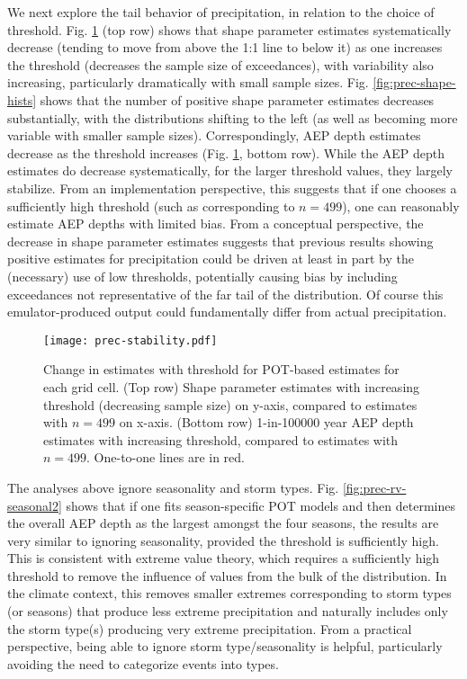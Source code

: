 \documentclass{ametsocV6.1}
\begin{document}
We next explore the tail behavior of precipitation, in relation to the choice of threshold. Fig. \ref{fig:prec-stability} (top row) shows that shape parameter estimates systematically decrease (tending to move from above the 1:1 line to below it) as one increases the threshold (decreases the sample size of exceedances), with variability also increasing, particularly dramatically with small sample sizes. Fig. \ref{fig:prec-shape-hists} shows that the number of positive shape parameter estimates decreases substantially, with the distributions shifting to the left (as well as becoming more variable with smaller sample sizes). Correspondingly, AEP depth estimates decrease as the threshold increases (Fig. \ref{fig:prec-stability}, bottom row). While the AEP depth estimates do decrease systematically, for the larger threshold values, they largely stabilize. From an implementation perspective, this suggests that if one chooses a sufficiently high threshold (such as corresponding to $n=499$), one can reasonably estimate AEP depths with limited bias. From a conceptual perspective, the decrease in shape parameter estimates suggests that previous results showing positive estimates for precipitation could be driven at least in part by the (necessary) use of low thresholds, potentially causing bias by including exceedances not representative of the far tail of the distribution. Of course this emulator-produced output could fundamentally differ from actual precipitation.

\begin{figure}
    \centering
    \texttt{[image: prec-stability.pdf]}
    \caption{Change in estimates with threshold for POT-based estimates for each grid cell. (Top row) Shape parameter estimates with increasing threshold (decreasing sample size) on y-axis, compared to estimates with $n=499$ on x-axis. (Bottom row) 1-in-100000 year AEP depth estimates with increasing threshold, compared to estimates with $n=499$. One-to-one lines are in red.}
    \label{fig:prec-stability}
\end{figure}

The analyses above ignore seasonality and storm types. Fig. \ref{fig:prec-rv-seasonal2} shows that if one fits season-specific POT models and then determines the overall AEP depth as the largest amongst the four seasons, the results are very similar to ignoring seasonality, provided the threshold is sufficiently high. This is consistent with extreme value theory, which requires a sufficiently high threshold to remove the influence of values from the bulk of the distribution. In the climate context, this removes smaller extremes corresponding to storm types (or seasons) that produce less extreme precipitation and naturally includes only the storm type(s) producing very extreme precipitation. From a practical perspective, being able to ignore storm type/seasonality is helpful, particularly avoiding the need to categorize events into types.
\end{document}
